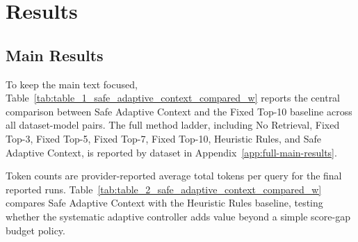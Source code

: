 \documentclass[11pt]{article}
\begin{document}
\section{Results}

\subsection{Main Results}

To keep the main text focused, Table~\ref{tab:table_1_safe_adaptive_context_compared_w} reports the central comparison between Safe Adaptive Context and the Fixed Top-10 baseline across all dataset-model pairs. The full method ladder, including No Retrieval, Fixed Top-3, Fixed Top-5, Fixed Top-7, Fixed Top-10, Heuristic Rules, and Safe Adaptive Context, is reported by dataset in Appendix~\ref{app:full-main-results}.


\begin{table}[t]
\centering
\small
\caption{Safe Adaptive Context compared with fixed top-10 full-document RAG.}
\label{tab:table_1_safe_adaptive_context_compared_w}
\end{table}

Token counts are provider-reported average total tokens per query for the final reported runs. Table~\ref{tab:table_2_safe_adaptive_context_compared_w} compares Safe Adaptive Context with the Heuristic Rules baseline, testing whether the systematic adaptive controller adds value beyond a simple score-gap budget policy.
\end{document}
